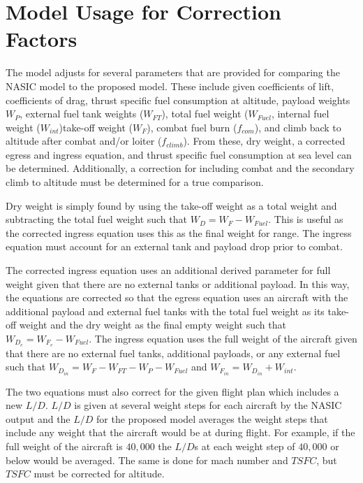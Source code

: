 \section{Model Usage for Correction Factors}
The model adjusts for several parameters that are provided for comparing the NASIC model to the proposed model. These include given coefficients of lift, coefficients of drag, thrust specific fuel consumption at altitude, payload weights $W_P$, external fuel tank weights ($W_{FT}$), total fuel weight ($W_{Fuel}$, internal fuel weight ($W_{int}$)take-off weight ($W_F$), combat fuel burn ($f_{com}$), and climb back to altitude after combat and/or loiter ($f_{climb}$). From these, dry weight, a corrected egress and ingress equation, and thrust specific fuel consumption at sea level can be determined. Additionally, a correction for including combat and the secondary climb to altitude must be determined for a true comparison.\par
Dry weight is simply found by using the take-off weight as a total weight and subtracting the total fuel weight such that $W_D = W_F - W_{Fuel}$. This is useful as the corrected ingress equation uses this as the final weight for range. The ingress equation must account for an external tank and payload drop prior to combat.\par
The corrected ingress equation uses an additional derived parameter for full weight given that there are no external tanks or additional payload. In this way, the equations are corrected so that the egress equation uses an aircraft with the additional payload and external fuel tanks with the total fuel weight as its take-off weight and the dry weight as the final empty weight such that $W_{D_e} = W_{F_e}-W_{Fuel}$. The ingress equation uses the full weight of the aircraft given that there are no external fuel tanks, additional payloads, or any external fuel such that $W_{D_{in}} = W_F-W_{FT}-W_P - W_{Fuel}$ and $W_{F_{in}} = W_{D_{in}} + W_{int}$. \par
The two equations must also correct for the given flight plan which includes a new $L/D$. $L/D$ is given at several weight steps for each aircraft by the NASIC output and the $L/D$ for the proposed model averages the weight steps that include any weight that the aircraft would be at during flight. For example, if the full weight of the aircraft is $40,000$ the $L/D$s at each weight step of $40,000$ or below would be averaged. The same is done for mach number and $TSFC$, but $TSFC$ must be corrected for altitude.\par
